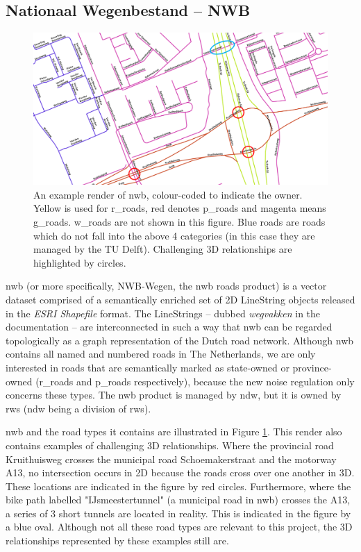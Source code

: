 \subsection{Nationaal Wegenbestand – NWB}
\label{sub:nwb}

\begin{figure}
    \centering
    \includegraphics[width=\linewidth]{final_report/figs/nwb_sample_02.png} 
    \caption[Example render of NWB, colour-coded to show road ownership]{An example render of \ac{nwb}, colour-coded to indicate the owner. Yellow is used for \ac{r_roads}, red denotes \ac{p_roads} and magenta means \ac{g_roads}. \ac{w_roads} are not shown in this figure. Blue roads are roads which do not fall into the above 4 categories (in this case they are managed by the TU Delft). Challenging 3D relationships are highlighted by circles.}
    \label{fig:nwb}
\end{figure}

\ac{nwb} (or more specifically, NWB-Wegen, the \ac{nwb} roads product) is a vector dataset comprised of a semantically enriched set of 2D LineString objects released in the \textit{ESRI Shapefile} format. The LineStrings – dubbed \textit{wegvakken} in the documentation – are interconnected in such a way that \ac{nwb} can be regarded topologically as a graph representation of the Dutch road network. Although \ac{nwb} contains all named and numbered roads in The Netherlands, we are only interested in roads that are semantically marked as state-owned or province-owned (\ac{r_roads} and \ac{p_roads} respectively), because the new noise regulation only concerns these types. The \ac{nwb} product is managed by \ac{ndw}, but it is owned by \ac{rws} (\ac{ndw} being a division of \ac{rws}).

\ac{nwb} and the road types it contains are illustrated in Figure \ref{fig:nwb}. This render also contains examples of challenging 3D relationships. Where the provincial road Kruithuisweg crosses the municipal road Schoemakerstraat and the motorway A13, no intersection occurs in 2D because the roads cross over one another in 3D. These locations are indicated in the figure by red circles. Furthermore, where the bike path labelled "IJsmeestertunnel" (a municipal road in \ac{nwb}) crosses the A13, a series of 3 short tunnels are located in reality. This is indicated in the figure by a blue oval. Although not all these road types are relevant to this project, the 3D relationships represented by these examples still are.

